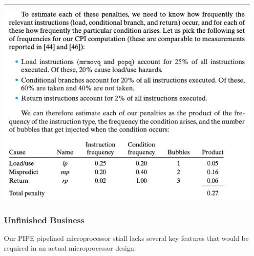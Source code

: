 \documentclass[11pt]{article}
\begin{document}
\noindent\rule{\textwidth}{0.5pt}

\begin{center}
\includegraphics[width=.9\linewidth]{pics/bubbles-penalty-example.png}
\end{center}


\subsubsection{Unfinished Business}
\label{sec:org7188786}
Our PIPE pipelined microprocessor stiall lacks several key features that would be required in an actual microprocessor design.\\
\end{document}
